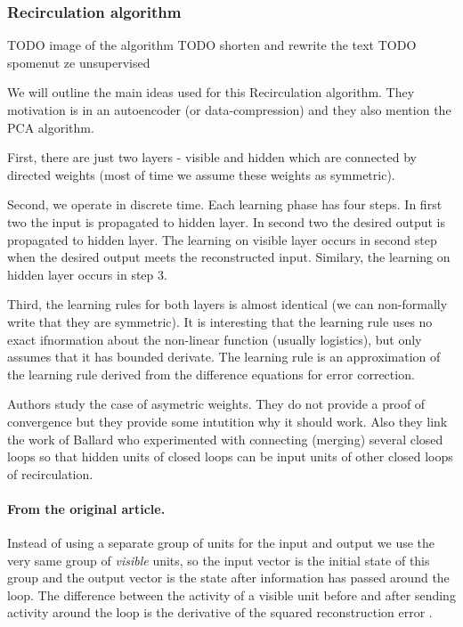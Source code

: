 \subsubsection{Recirculation algorithm}
\label{models-recirc} 

TODO image of the algorithm 
TODO shorten and rewrite the text 
TODO spomenut ze unsupervised 

We will outline the main ideas used for this Recirculation algorithm. They motivation is in an autoencoder (or data-compression) and they also mention the PCA algorithm. 

First, there are just two layers - visible and hidden which are connected by directed weights (most of time we assume these weights as symmetric). 

Second, we operate in discrete time. Each learning phase has four steps. In first two the input is propagated to hidden layer. In second two the desired output is propagated to hidden layer. The learning on visible layer occurs in second step when the desired output meets the reconstructed input. Similary, the learning on hidden layer occurs in step 3.

Third, the learning rules for both layers is almost identical (we can non-formally write that they are symmetric). It is interesting that the learning rule uses no exact ifnormation about the non-linear function (usually logistics), but only assumes that it has bounded derivate. The learning rule is an approximation of the learning rule derived from the difference equations for error correction. 

Authors study the case of asymetric weights. They do not provide a proof of convergence but they provide some intutition why it should work. Also they link the work of Ballard who experimented with connecting (merging) several closed loops so that hidden units of closed loops can be input units of other closed loops of recirculation.

\paragraph{From the original article.}
Instead of using a separate group of units for the input and output we use the very same group of \textit{visible} units, so the input vector is the initial state of this group and the output vector is the state after information has passed around the loop. The difference between the activity of a visible unit before and after sending activity around the loop is the derivative of the squared reconstruction error \citet{hinton1988learning}.

